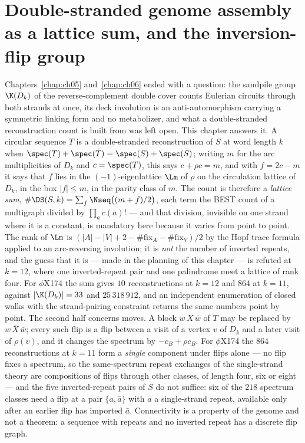 \chapter[Double-stranded assembly as a lattice sum]{Double-stranded genome assembly as a lattice sum, and the inversion-flip group}\label{chap:ch07}
\begin{chaptersummary}
Chapters~\ref{chap:ch05} and~\ref{chap:ch06} ended with a question: the sandpile group
$\K(D_k)$ of the reverse-complement double cover counts Eulerian circuits through both
strands at once, its deck involution is an anti-automorphism carrying a symmetric linking
form and no metabolizer, and what a double-stranded reconstruction count is built from was
left open. This chapter answers it. A circular sequence $T$ is a double-stranded reconstruction
of $S$ at word length $k$ when $\spec(T)+\spec(\bar T)=\spec(S)+\spec(\bar S)$; writing $m$
for the arc multiplicities of $D_k$ and $c=\spec(T)$, this says $c+\rho c=m$, and with
$f=2c-m$ it says that $f$ lies in the $(-1)$-eigenlattice $\Lm$ of $\rho$ on the circulation
lattice of $D_k$, in the box $|f|\le m$, in the parity class of $m$. The count is therefore a
\emph{lattice sum}, $\#\DS(S,k)=\sum_f \Nseq\big((m+f)/2\big)$, each term the BEST count of a
multigraph divided by $\prod_a c(a)!$ --- and that division, invisible on one strand where it
is a constant, is mandatory here because it varies from point to point. The rank of $\Lm$ is
$(|A|-|V|+2-\#\mathrm{fix}_A-\#\mathrm{fix}_V)/2$ by the Hopf trace formula applied to an
arc-reversing involution; it is \emph{not} the number of inverted repeats, and the guess that
it is --- made in the planning of this chapter --- is refuted at $k=12$, where one inverted-repeat
pair and one palindrome meet a lattice of rank four. For $\phi$X174 the sum gives $10$
reconstructions at $k=12$ and $864$ at $k=11$, against $|\K(D_k)|=33$ and $25\,318\,912$, and
an independent enumeration of closed walks with the strand-pairing constraint returns the
same numbers point by point. The second half concerns moves. A block $w\,X\,\bar w$ of $T$ may
be replaced by $w\,\overline{X}\,\bar w$; every such flip is a flip between a visit of a
vertex $v$ of $D_k$ and a later visit of $\rho(v)$, and it changes the spectrum by
$-c_B+\rho c_B$. For $\phi$X174 the $864$ reconstructions at $k=11$ form a \emph{single}
component under flips alone --- no flip fixes a spectrum, so the same-spectrum repeat
exchanges of the single-strand theory are compositions of flips through other classes, of
length four, six or eight --- and the five inverted-repeat pairs of $S$ do not suffice: six of
the $218$ spectrum classes need a flip at a pair $\{a,\bar a\}$ with $a$ a single-strand
repeat, available only after an earlier flip has imported $\bar a$. Connectivity is a property
of the genome and not a theorem: a sequence with repeats and no inverted repeat has a discrete
flip graph.
\end{chaptersummary}


